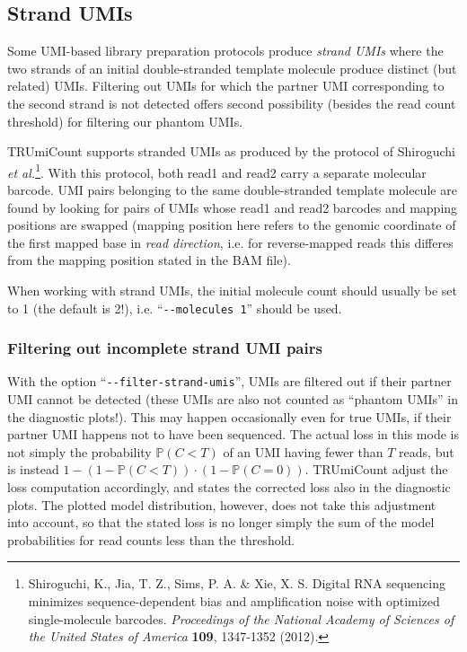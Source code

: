 \documentclass[10pt]{article}
\newcommand{\ddarg}[1]{\texttt{-{}-#1}}
\begin{document}
\pagebreak
\subsection{Strand UMIs}

Some UMI-based library preparation protocols produce \emph{strand UMIs} where the two strands of an initial double-stranded template molecule produce distinct (but related) UMIs. Filtering out UMIs for which the partner UMI corresponding to the second strand is not detected offers second possibility (besides the read count threshold) for filtering our phantom UMIs.

TRUmiCount supports stranded UMIs as produced by the protocol of Shiroguchi \textit{et al.}\footnote{Shiroguchi, K., Jia, T. Z., Sims, P. A. \& Xie, X. S. Digital RNA sequencing minimizes sequence-dependent bias and amplification noise with optimized single-molecule barcodes. \textit{Proceedings of the National Academy of Sciences of the United States of America} \textbf{109}, 1347-1352 (2012).}. With this protocol, both read1 and read2 carry a separate molecular barcode. UMI pairs belonging to the same double-stranded template molecule are found by looking for pairs of UMIs whose read1 and read2 barcodes and mapping positions are swapped (mapping position here refers to the genomic coordinate of the first mapped base in \emph{read direction}, i.e. for reverse-mapped reads this differes from the mapping position stated in the BAM file).

When working with strand UMIs, the initial molecule count should usually be set to 1 (the default is 2!), i.e. ``\ddarg{molecules 1}'' should be used.

\subsubsection*{Filtering out incomplete strand UMI pairs}

With the option ``\ddarg{filter-strand-umis}'', UMIs are filtered out if their partner UMI cannot be detected (these UMIs are also not counted as ``phantom UMIs'' in the diagnostic plots!). This may happen occasionally even for true UMIs, if their partner UMI happens not to have been sequenced. The actual loss in this mode is not simply the probability $\mathbb{P}(C < T)$ of an UMI having fewer than $T$ reads, but is instead $1 - (1 - \mathbb{P}(C < T))\cdot (1 - \mathbb{P}(C=0))$. TRUmiCount adjust the loss computation accordingly, and states the corrected loss also in the diagnostic plots. The plotted model distribution, however, does not take this adjustment into account, so that the stated loss is no longer simply the sum of the model probabilities for read counts less than the threshold.
\end{document}
